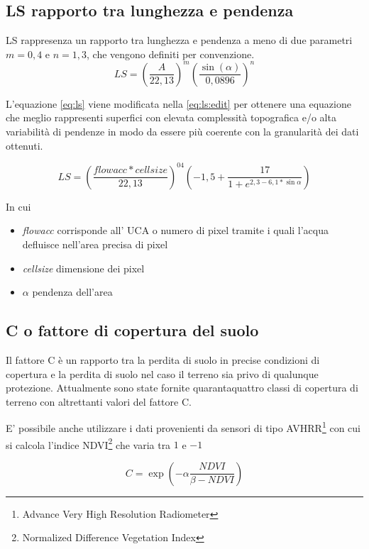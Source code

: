 \subsection{LS rapporto tra lunghezza e pendenza}
LS rappresenza un rapporto tra lunghezza e pendenza a meno di due parametri $m=0,4$ e $n=1,3$, che vengono definiti per convenzione.
\begin{equation}\label{eq:ls}
	LS = \left(  \dfrac{A}{22,13} \right)^m
	\left(  \dfrac{\sin(\alpha)}{0,0896} \right)^n
\end{equation}

L'equazione \eqref{eq:ls} viene modificata nella \eqref{eq:ls:edit} per ottenere una equazione che meglio rappresenti superfici con elevata complessità topografica e/o alta variabilità di pendenze in modo da essere più coerente con la granularità dei dati ottenuti.

\begin{equation}\label{eq:ls:edit}
LS=\left( \dfrac{flowacc * cellsize}{22,13}\right)^{04} \left( -1,5+\dfrac{17}{1+ e^{2,3-6,1*\sin{\alpha}}} \right)
\end{equation}

In cui
\begin{itemize}
	\item \textit{flowacc} corrisponde all' UCA  o numero di pixel tramite i quali l'acqua defluisce nell'area precisa di pixel
	\item \textit{cellsize} dimensione dei pixel
	\item \textit{$\alpha$} pendenza dell'area
\end{itemize}

\subsection{C o fattore di copertura del suolo}
Il fattore C è un rapporto tra la perdita di suolo in precise condizioni di copertura e la perdita di suolo nel caso il terreno sia privo di qualunque protezione.
Attualmente sono state fornite quarantaquattro classi di copertura di terreno con altrettanti valori del fattore C.

E' possibile anche utilizzare i dati provenienti da sensori di tipo AVHRR\footnote{Advance Very High Resolution Radiometer} con cui si calcola l'indice  NDVI\footnote{Normalized Difference Vegetation Index} che varia tra $1$ e $-1$

\begin{equation}\label{eq:c}
	C=\exp\left( -\alpha \dfrac{NDVI}{\beta -NDVI} \right)
\end{equation}

